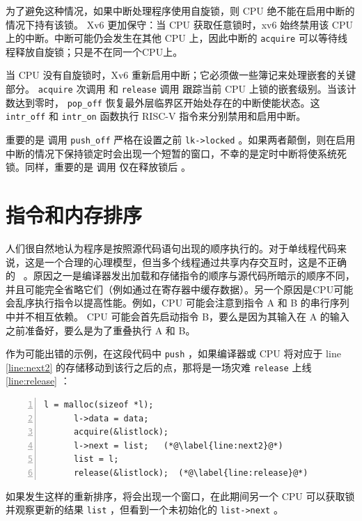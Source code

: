\documentclass[UTF8]{article}
\begin{document}
为了避免这种情况，如果中断处理程序使用自旋锁，则 CPU 绝不能在启用中断的情况下持有该锁。 Xv6 更加保守：当 CPU 获取任意锁时，xv6 始终禁用该 CPU 上的中断。中断可能仍会发生在其他 CPU 上，因此中断的
    \lstinline{acquire}   可以等待线程释放自旋锁；只是不在同一个CPU上。  

当 CPU 没有自旋锁时，Xv6 重新启用中断；它必须做一些簿记来处理嵌套的关键部分。
    \lstinline{acquire}    次调用
        和
    \lstinline{release}    调用
        跟踪当前 CPU 上锁的嵌套级别。当该计数达到零时，
    \lstinline{pop_off}    恢复最外层临界区开始处存在的中断使能状态。这
    \lstinline{intr_off}    和
    \lstinline{intr_on}    函数执行 RISC-V 指令来分别禁用和启用中断。  

重要的是
        调用
    \lstinline{push_off}    严格在设置之前
    \lstinline{lk->locked}   
        。如果两者颠倒，则在启用中断的情况下保持锁定时会出现一个短暂的窗口，不幸的是定时中断将使系统死锁。同样，重要的是
        调用
        仅在释放锁后
        。
    \section{指令和内存排序  }     

人们很自然地认为程序是按照源代码语句出现的顺序执行的。对于单线程代码来说，这是一个合理的心理模型，但当多个线程通过共享内存交互时，这是不正确的~    \cite{riscv:user,boehm04}    。原因之一是编译器发出加载和存储指令的顺序与源代码所暗示的顺序不同，并且可能完全省略它们（例如通过在寄存器中缓存数据）。另一个原因是CPU可能会乱序执行指令以提高性能。例如，CPU 可能会注意到指令 A 和 B 的串行序列中并不相互依赖。 CPU 可能会首先启动指令 B，要么是因为其输入在 A 的输入之前准备好，要么是为了重叠执行 A 和 B。  

作为可能出错的示例，在这段代码中
    \lstinline{push}    ，如果编译器或 CPU 将对应于 line~    \ref{line:next2}    的存储移动到该行之后的点，那将是一场灾难
    \lstinline{release}   上线~    \ref{line:release}   ：
    \begin{lstlisting}[numbers=left,firstnumber=1]
      l = malloc(sizeof *l);
      l->data = data;
      acquire(&listlock);
      l->next = list;   (*@\label{line:next2}@*)
      list = l;      
      release(&listlock);  (*@\label{line:release}@*)
\end{lstlisting}    如果发生这样的重新排序，将会出现一个窗口，在此期间另一个 CPU 可以获取锁并观察更新的结果
    \lstinline{list}    ，但看到一个未初始化的
    \lstinline{list->next}    。  
\end{document}
